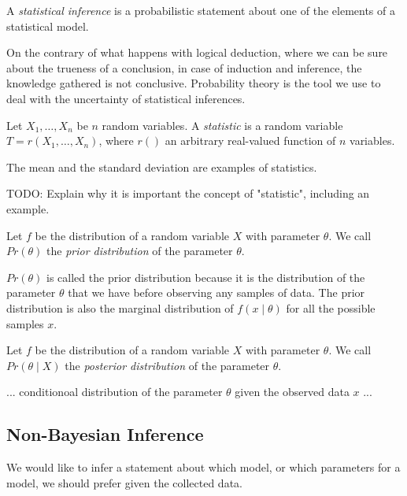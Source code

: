 \begin{definition}
A \emph{statistical inference} is a probabilistic statement about one of the elements of a statistical model.
\end{definition}

On the contrary of what happens with logical deduction, where we can be sure about the trueness of a conclusion, in case of induction and inference, the knowledge gathered is not conclusive. Probability theory is the tool we use to deal with the uncertainty of statistical inferences.

\begin{definition}
Let $X_1, \ldots, X_n$ be $n$ random variables. A \emph{statistic} is a random variable $T = r \left( X_1, \ldots, X_n \right)$, where $r()$ an arbitrary real-valued function of $n$ variables.
\end{definition}

The mean and the standard deviation are examples of statistics.

{\color{red} TODO: Explain why it is important the concept of "statistic", including an example.}

\begin{definition}
Let $f$ be the distribution of a random variable $X$ with parameter $\theta$. We call $Pr(\theta)$ the \emph{prior distribution} of the parameter $\theta$.
\end{definition}

$Pr(\theta)$ is called the prior distribution because it is the distribution of the parameter $\theta$ that we have before observing any samples of data. The prior distribution is also the marginal distribution of $f(x \mid \theta)$ for all the possible samples $x$.

\begin{definition}
Let $f$ be the distribution of a random variable $X$ with parameter $\theta$. We call $Pr(\theta \mid X)$ the \emph{posterior distribution} of the parameter $\theta$.
\end{definition}

... conditionoal distribution of the parameter $\theta$ given the observed data $x$ ...


\subsection{Non-Bayesian Inference}

We would like to infer a statement about which model, or which parameters for a model, we should prefer given the collected data. 

